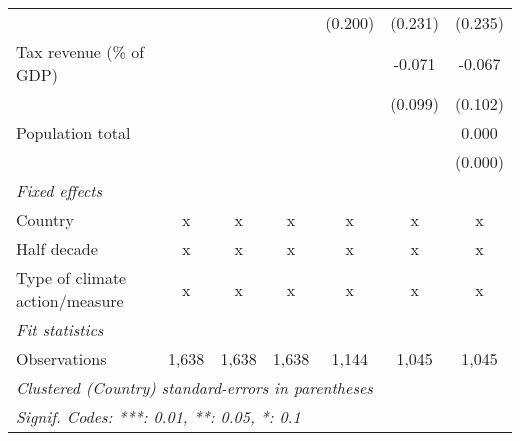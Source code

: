 \begin{tabular}{lcccccc}
                                                   &         &         &                & (0.200)        & (0.231)        & (0.235)\\   
   Tax revenue (\% of GDP)                         &         &         &                &                & -0.071         & -0.067\\   
                                                   &         &         &                &                & (0.099)        & (0.102)\\   
   Population total                                &         &         &                &                &                & 0.000\\   
                                                   &         &         &                &                &                & (0.000)\\   
   \emph{Fixed effects}\\
   Country                                         & x       & x       & x              & x              & x              & x\\  
   Half decade                                     & x       & x       & x              & x              & x              & x\\  
   Type of climate action/measure                  & x       & x       & x              & x              & x              & x\\  
   \midrule \emph{Fit statistics}\\
   Observations                                    & 1,638   & 1,638   & 1,638          & 1,144          & 1,045          & 1,045\\  
   \midrule
   \multicolumn{7}{l}{\emph{Clustered (Country) standard-errors in parentheses}}\\
   \multicolumn{7}{l}{\emph{Signif. Codes: ***: 0.01, **: 0.05, *: 0.1}}\\
\end{tabular}
\par\endgroup


